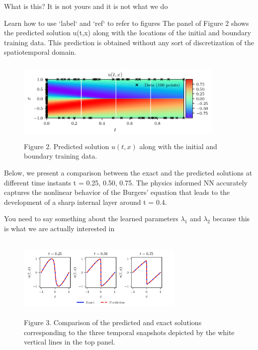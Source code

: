 \documentclass{beamer}
\def\\{}%
\begin{document}
\begin{frame}
{\color{red}What is this? It is not yours and it is not what we do}

{\color{red} Learn how to use `label` and `ref` to refer to figures}
The panel of Figure 2 shows the predicted solution u(t,x) along with the
locations of the initial and boundary training data. This prediction is obtained
without any sort of discretization of the spatiotemporal domain. 

\begin{figure}
\centering
\includegraphics[width = 10cm , height = 4cm]{images/predicted_sol_burgers.png}
\\
\caption{Figure 2. Predicted solution $u(t,x)$ along with the initial and
boundary training data.}
\end{figure}

\end{frame}

\begin{frame}

Below, we present a comparison between the exact and the predicted solutions at
different time instants t = 0.25, 0.50, 0.75. The physics informed NN accurately
captures the nonlinear behavior of the Burgers' equation that leads to the
development of a sharp internal layer around t = 0.4.

{\color{red}You need to say something about the learned parameters $\lambda_1$
and $\lambda_2$ because this is what we are actually interested in}
    
\begin{figure}
\centering
\includegraphics[width = 8cm , height = 4cm]{images/exact_pred_burgers.png}
\\
\caption{Figure 3. Comparison of the predicted and exact solutions
corresponding to the three temporal snapshots depicted by the white vertical
lines in the top panel.}
\end{figure}

\end{frame}
\end{document}
